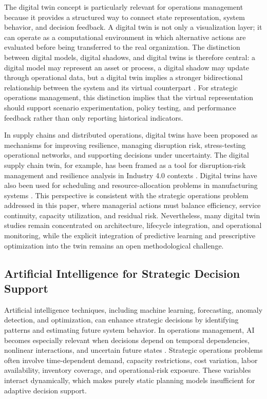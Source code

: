 \documentclass[apajournal,article,submit,pdftex,moreauthors]{Definitions/mdpi}
\begin{document}
The digital twin concept is particularly relevant for operations management because it provides a structured way to connect state representation, system behavior, and decision feedback. A digital twin is not only a visualization layer; it can operate as a computational environment in which alternative actions are evaluated before being transferred to the real organization. The distinction between digital models, digital shadows, and digital twins is therefore central: a digital model may represent an asset or process, a digital shadow may update through operational data, but a digital twin implies a stronger bidirectional relationship between the system and its virtual counterpart \citep{kritzinger2018digital}. For strategic operations management, this distinction implies that the virtual representation should support scenario experimentation, policy testing, and performance feedback rather than only reporting historical indicators.

In supply chains and distributed operations, digital twins have been proposed as mechanisms for improving resilience, managing disruption risk, stress-testing operational networks, and supporting decisions under uncertainty. The digital supply chain twin, for example, has been framed as a tool for disruption-risk management and resilience analysis in Industry 4.0 contexts \citep{ivanov2021digital,ivanov2019ripple,burgos2021food,ivanov2023idt,nascimento2022cloud}. Digital twins have also been used for scheduling and resource-allocation problems in manufacturing systems \citep{fang2019jobshop,zhang2021dynamic,leng2021automated,liu2021shared,zhang2024schedulingreview}. This perspective is consistent with the strategic operations problem addressed in this paper, where managerial actions must balance efficiency, service continuity, capacity utilization, and residual risk. Nevertheless, many digital twin studies remain concentrated on architecture, lifecycle integration, and operational monitoring, while the explicit integration of predictive learning and prescriptive optimization into the twin remains an open methodological challenge.

\subsection{Artificial Intelligence for Strategic Decision Support}
Artificial intelligence techniques, including machine learning, forecasting, anomaly detection, and optimization, can enhance strategic decisions by identifying patterns and estimating future system behavior. In operations management, AI becomes especially relevant when decisions depend on temporal dependencies, nonlinear interactions, and uncertain future states \citep{toorajipour2021ai,boonmee2019prescriptive,bertsimas2024explainable}. Strategic operations problems often involve time-dependent demand, capacity restrictions, cost variation, labor availability, inventory coverage, and operational-risk exposure. These variables interact dynamically, which makes purely static planning models insufficient for adaptive decision support.
\end{document}
